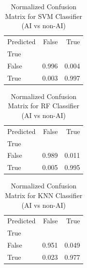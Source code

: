 \begin{table}[ht]\centering
\begin{tabular}{lrr}
\toprule
Predicted & False & True \\
True &  &  \\
\midrule
False & 0.996 & 0.004 \\
True & 0.003 & 0.997 \\
\bottomrule
\end{tabular}
\caption{Normalized Confusion Matrix for SVM Classifier (AI vs non-AI)}
\end{table}

\begin{table}[ht]\centering
\begin{tabular}{lrr}
\toprule
Predicted & False & True \\
True &  &  \\
\midrule
False & 0.989 & 0.011 \\
True & 0.005 & 0.995 \\
\bottomrule
\end{tabular}
\caption{Normalized Confusion Matrix for RF Classifier (AI vs non-AI)}
\end{table}

\begin{table}[ht]\centering
\begin{tabular}{lrr}
\toprule
Predicted & False & True \\
True &  &  \\
\midrule
False & 0.951 & 0.049 \\
True & 0.023 & 0.977 \\
\bottomrule
\end{tabular}
\caption{Normalized Confusion Matrix for KNN Classifier (AI vs non-AI)}
\end{table}

